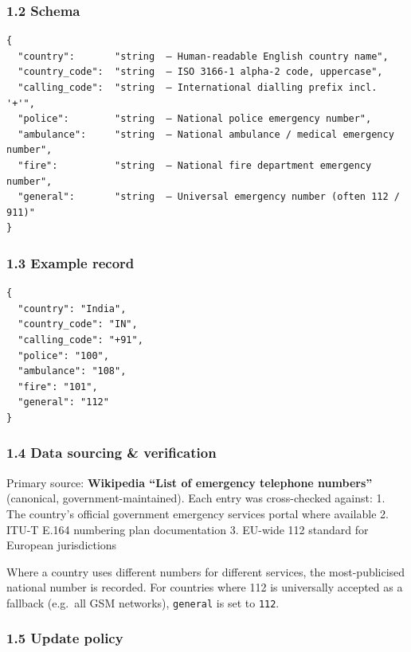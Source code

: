 \hypertarget{schema}{%
\subsubsection{1.2 Schema}\label{schema}}

\begin{verbatim}
{
  "country":       "string  — Human-readable English country name",
  "country_code":  "string  — ISO 3166-1 alpha-2 code, uppercase",
  "calling_code":  "string  — International dialling prefix incl. '+'",
  "police":        "string  — National police emergency number",
  "ambulance":     "string  — National ambulance / medical emergency number",
  "fire":          "string  — National fire department emergency number",
  "general":       "string  — Universal emergency number (often 112 / 911)"
}
\end{verbatim}

\hypertarget{example-record}{%
\subsubsection{1.3 Example record}\label{example-record}}

\begin{verbatim}
{
  "country": "India",
  "country_code": "IN",
  "calling_code": "+91",
  "police": "100",
  "ambulance": "108",
  "fire": "101",
  "general": "112"
}
\end{verbatim}

\hypertarget{data-sourcing-verification}{%
\subsubsection{1.4 Data sourcing \&
verification}\label{data-sourcing-verification}}

Primary source: \textbf{Wikipedia ``List of emergency telephone
numbers''} (canonical, government-maintained). Each entry was
cross-checked against: 1. The country's official government emergency
services portal where available 2. ITU-T E.164 numbering plan
documentation 3. EU-wide 112 standard for European jurisdictions

Where a country uses different numbers for different services, the
most-publicised national number is recorded. For countries where 112 is
universally accepted as a fallback (e.g.~all GSM networks),
\texttt{general} is set to \texttt{112}.

\hypertarget{update-policy}{%
\subsubsection{1.5 Update policy}\label{update-policy}}

